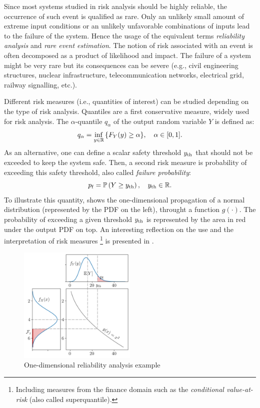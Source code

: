 Since most systems studied in risk analysis should be highly reliable, the occurrence of such event is qualified as rare. 
Only an unlikely small amount of extreme input conditions or an unlikely unfavorable combinations of inputs lead to the failure of the system. 
Hence the usage of the equivalent terms \textit{reliability analysis} and \textit{rare event estimation}. 
The notion of risk associated with an event is often decomposed as a product of likelihood and impact. 
The failure of a system might be very rare but its consequences can be severe (e.g., civil engineering structures, nuclear infrastructure, telecommunication networks, electrical grid, railway signalling, etc.).

Different risk measures (i.e., quantities of interest) can be studied depending on the type of risk analysis. 
Quantiles are a first conservative measure, widely used for risk analysis. 
The $\alpha$-quantile $q_\alpha$ of the output random variable $Y$ is defined as:
\begin{equation}
    q_\alpha = \inf_{y\in\mathbb{R}}{\left\{F_Y(y) \geq \alpha\right\}}, \quad \alpha \in [0, 1].    
\end{equation}
As an alternative, one can define a scalar safety threshold $y_\mathrm{th}$ that should not be exceeded to keep the system safe. 
Then, a second risk measure is probability of exceeding this safety threshold, also called \textit{failure probability}: 
\begin{equation}
    p_\mathrm{f} = \mathbb{P}\left(Y \geq y_\mathrm{th}\right), \quad y_\mathrm{th}\in\mathbb{R}.
\end{equation}
To illustrate this quantity,  shows the one-dimensional propagation of a normal distribution (represented by the PDF on the left), throught a function $g(\cdot)$.
The probability of exceeding a given threshold $y_\mathrm{th}$ is represented by the area in red under the output PDF on top.
An interesting reflection on the use and the interpretation of risk measures
\footnote{Including measures from the finance domain such as the \textit{conditional value-at-risk} (also called superquantile).} 
is presented in \citet{rockafellar_2015}. 

\begin{figure}
    \centering
    \includegraphics[width=0.5\textwidth]{../numerical_experiments/chapter1/figures/1D_reliability.png}
    \caption{One-dimensional reliability analysis example}
    \label{fig:1D_reliability}
\end{figure}

